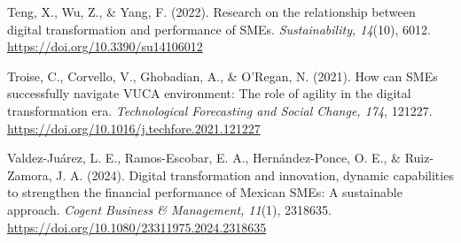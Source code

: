 \documentclass[spanish,letterpaper,oneside]{article}
\newenvironment{apareferences}{%
  \begin{list}{}{\setlength{\leftmargin}{1.27cm}%
    \setlength{\itemindent}{-1.27cm}%
    \setlength{\itemsep}{0.75\baselineskip}%
    \setlength{\parsep}{0pt}}}{\end{list}}
\begin{document}
\begin{apareferences}
  \item Teng, X., Wu, Z., \& Yang, F. (2022). Research on the relationship between digital transformation and performance of SMEs. \emph{Sustainability, 14}(10), 6012. \url{https://doi.org/10.3390/su14106012}

  \item Troise, C., Corvello, V., Ghobadian, A., \& O'Regan, N. (2021). How can SMEs successfully navigate VUCA environment: The role of agility in the digital transformation era. \emph{Technological Forecasting and Social Change, 174}, 121227. \url{https://doi.org/10.1016/j.techfore.2021.121227}

  \item Valdez-Juárez, L. E., Ramos-Escobar, E. A., Hernández-Ponce, O. E., \& Ruiz-Zamora, J. A. (2024). Digital transformation and innovation, dynamic capabilities to strengthen the financial performance of Mexican SMEs: A sustainable approach. \emph{Cogent Business \& Management, 11}(1), 2318635. \url{https://doi.org/10.1080/23311975.2024.2318635}
\end{apareferences}
\end{document}
